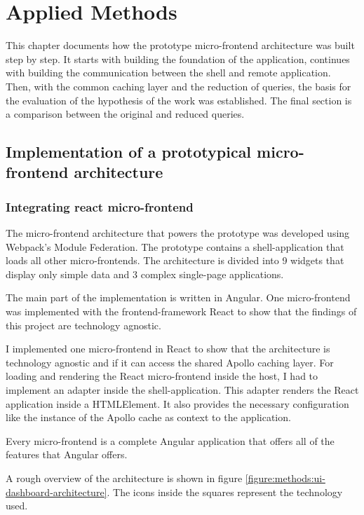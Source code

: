 \chapter{Applied Methods}\label{chapter:applied-methods}

This chapter documents how the prototype micro-frontend architecture was built step by step. It starts with building the foundation of the application, continues with building the communication between the shell and remote application. Then, with the common caching layer and the reduction of queries, the basis for the evaluation of the hypothesis of the work was established. The final section is a comparison between the original and reduced queries.

\section{Implementation of a prototypical micro-frontend architecture}

\subsection{Integrating react micro-frontend}

The micro-frontend architecture that powers the prototype was developed using Webpack's Module Federation. The prototype contains a shell-application that loads all other micro-frontends. The architecture is divided into 9 widgets that display only simple data and 3 complex single-page applications.

The main part of the implementation is written in Angular. One micro-frontend was implemented with the frontend-framework React to show that the findings of this project are technology agnostic.

I implemented one micro-frontend in React to show that the architecture is technology agnostic and if it can access the shared Apollo caching layer. For loading and rendering the React micro-frontend inside the host, I had to implement an adapter inside the shell-application. This adapter renders the React application inside a HTMLElement. It also provides the necessary configuration like the instance of the Apollo cache as context to the application. 

Every micro-frontend is a complete Angular application that offers all of the features that Angular offers. 

A rough overview of the architecture is shown in figure \ref{figure:methods:ui-dashboard-architecture}. The icons inside the squares represent the technology used.

